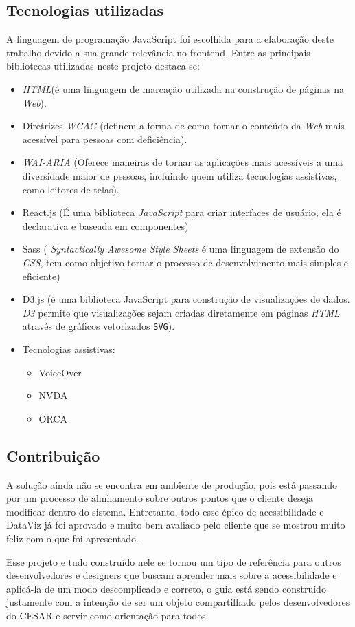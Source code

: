 \subsection{Tecnologias utilizadas} 
{A linguagem de programação JavaScript foi escolhida para a elaboração deste trabalho devido a sua grande relevância no frontend. Entre as principais bibliotecas utilizadas neste projeto destaca-se:
\begin{itemize}
\item \textit{HTML}(é uma linguagem de marcação utilizada na construção de páginas na \textit{Web}).
\item Diretrizes \textit{WCAG} (definem a forma de como tornar o conteúdo da \textit{Web} mais acessível para pessoas com deficiência).
\item \textit{WAI-ARIA} (Oferece maneiras de tornar as aplicações mais acessíveis a uma diversidade maior de pessoas, incluindo quem utiliza tecnologias assistivas, como leitores de telas).
\item React.js (É uma biblioteca \textit{JavaScript} para criar interfaces de usuário, ela é declarativa e baseada em componentes)
\item Sass ( \textit{Syntactically Awesome Style Sheets} é uma linguagem de extensão do \textit{CSS}, tem como objetivo tornar o processo de desenvolvimento mais simples e eficiente)
\item D3.js (é uma biblioteca {JavaScript} para construção de visualizações de dados. \textit{D3} permite que visualizações sejam criadas diretamente em páginas \textit{HTML} através de gráficos vetorizados \lstinline{SVG}).
\item Tecnologias assistivas:
\begin{itemize}
\item VoiceOver
\item NVDA
\item ORCA
\end{itemize}
\end{itemize}
 }
\subsection{Contribuição}
{⁠A solução ainda não se encontra em ambiente de produção, pois está passando por um processo de alinhamento sobre outros pontos que o cliente deseja modificar dentro do sistema. Entretanto, todo esse épico de acessibilidade e DataViz já foi aprovado e muito bem avaliado pelo cliente que se mostrou muito feliz com o que foi apresentado.

Esse projeto e tudo construído nele se tornou um tipo de referência para outros desenvolvedores e designers que buscam aprender mais sobre a acessibilidade e aplicá-la de um modo descomplicado e correto, o guia está sendo construído justamente com a intenção de ser um objeto compartilhado pelos desenvolvedores do CESAR e servir como orientação para todos. 

}
